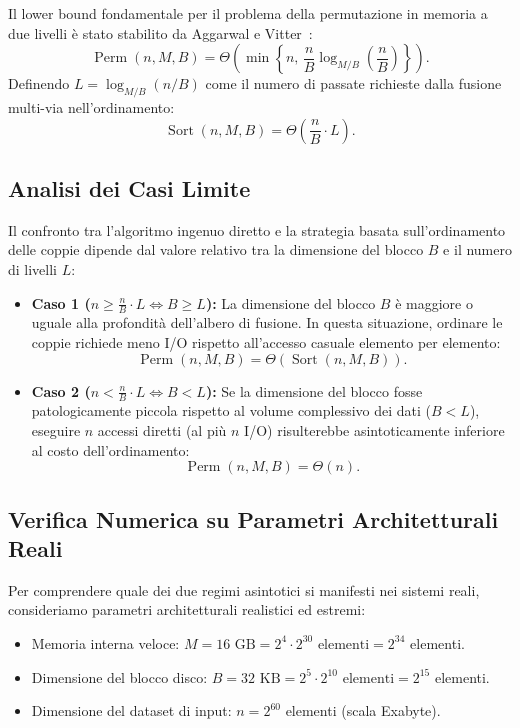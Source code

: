 Il lower bound fondamentale per il problema della permutazione in memoria a due livelli è stato stabilito da Aggarwal e Vitter~\cite{aggarwal1988}:
\begin{equation}
  \operatorname{Perm}(n, M, B) = \Theta\left(\min\left\{ n, \, \frac{n}{B} \log_{M/B}\left(\frac{n}{B}\right) \right\}\right).
\end{equation}
Definendo $L = \log_{M/B}(n/B)$ come il numero di passate richieste dalla fusione multi-via nell'ordinamento:
\begin{equation}
  \operatorname{Sort}(n, M, B) = \Theta\left(\frac{n}{B} \cdot L\right).
\end{equation}

\FloatBarrier
\subsection{Analisi dei Casi Limite}
\label{subsec:corner-cases}

Il confronto tra l'algoritmo ingenuo diretto e la strategia basata sull'ordinamento delle coppie dipende dal valore relativo tra la dimensione del blocco $B$ e il numero di livelli $L$:
\begin{itemize}
  \item \textbf{Caso 1 ($n \ge \frac{n}{B} \cdot L \iff B \ge L$):}  
  La dimensione del blocco $B$ è maggiore o uguale alla profondità dell'albero di fusione. In questa situazione, ordinare le coppie richiede meno I/O rispetto all'accesso casuale elemento per elemento:
  \[
    \operatorname{Perm}(n, M, B) = \Theta(\operatorname{Sort}(n, M, B)).
  \]
  \item \textbf{Caso 2 ($n < \frac{n}{B} \cdot L \iff B < L$):}  
  Se la dimensione del blocco fosse patologicamente piccola rispetto al volume complessivo dei dati ($B < L$), eseguire $n$ accessi diretti (al più $n$ I/O) risulterebbe asintoticamente inferiore al costo dell'ordinamento:
  \[
    \operatorname{Perm}(n, M, B) = \Theta(n).
  \]
\end{itemize}

\FloatBarrier
\subsection{Verifica Numerica su Parametri Architetturali Reali}
\label{subsec:numerical-check}

Per comprendere quale dei due regimi asintotici si manifesti nei sistemi reali, consideriamo parametri architetturali realistici ed estremi:
\begin{itemize}
  \item Memoria interna veloce: $M = 16\text{ GB} = 2^4 \cdot 2^{30} \text{ elementi} = 2^{34}$ elementi.
  \item Dimensione del blocco disco: $B = 32\text{ KB} = 2^5 \cdot 2^{10} \text{ elementi} = 2^{15}$ elementi.
  \item Dimensione del dataset di input: $n = 2^{60}$ elementi (scala Exabyte).
\end{itemize}

